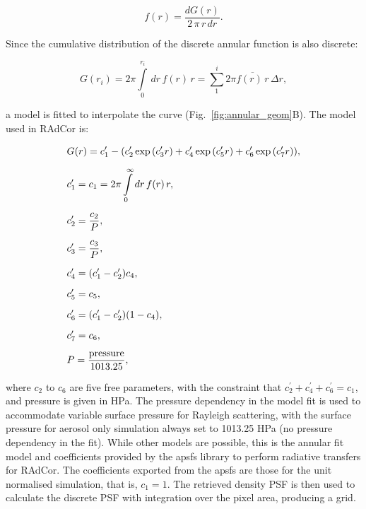 \begin{equation}
f(r) = \frac{d G(r)}{2 \, \pi \, r \, d r}.
\label{eq:annular_derivative}
\end{equation}

Since the cumulative distribution of the discrete annular function is also discrete:

\begin{equation}
G(r_i) = 2 \pi \int\limits_{0}^{r_i} \, d r \, f(r) \, r = \sum\limits_1^i 2 \pi \overbar{f(r) \, r} \, \Delta r,
\label{eq:annular_cumulative}
\end{equation} 

\noindent a model is fitted to interpolate the curve (Fig.~\ref{fig:annular_geom}B). The model used in RAdCor is:

\begin{equation}
\openup 2\jot
\begin{split}
&G(r) = c_1^\prime - (c_2^\prime \exp{(c_3^\prime r)} + c_4^\prime \exp{(c_5^\prime r)} + c_6^\prime \exp{(c_7^\prime r})), \\
&c_1^\prime = c_1 = 2\pi \int\limits_0^\infty d r \, f(r) \, r, \\
&c_2^\prime = \frac{c_2}{P}, \\
&c_3^\prime = \frac{c_3}{P}, \\
&c_4^\prime = (c_1^\prime - c_2^\prime) c_4, \\
&c_5^\prime = c_5, \\
&c_6^\prime = (c_1^\prime - c_2^\prime) (1 - c_4), \\
&c_7^\prime = c_6, \\
&P = \frac{\text{pressure}}{1013.25},
\end{split}
\label{eq:annular_fit}
\end{equation} 

\noindent where $c_2$ to $c_6$ are five free parameters, with the constraint that $c_2^\prime + c_4^\prime + c_6^\prime = c_1$, and pressure is given in HPa. The pressure dependency in the model fit is used to accommodate variable surface pressure for Rayleigh scattering, with the surface pressure for aerosol only simulation always set to 1013.25 HPa (no pressure dependency in the fit). While other models are possible, this is the annular fit model and coefficients provided by the apsfs library to perform radiative transfers for RAdCor. The coefficients exported from the apsfs are those for the unit normalised simulation, that is, $c_1 = 1$. The retrieved density PSF is then used to calculate the discrete PSF with integration over the pixel area, producing a grid. 

